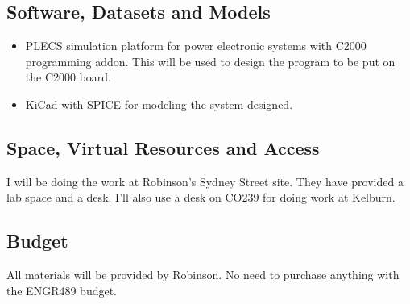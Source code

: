 \documentclass[11pt, a4paper, twoside, openright]{article}
\begin{document}

\subsection{Software, Datasets and Models}
\begin{itemize}
	\item PLECS simulation platform for power electronic systems with C2000 programming addon. This will be used to design the program to be put on the C2000 board.
	\item KiCad with SPICE for modeling the system designed.
\end{itemize}


\subsection{Space, Virtual Resources and Access}
I will be doing the work at Robinson's Sydney Street site. They have provided a lab space and a desk. I'll also use a desk on CO239 for doing work at Kelburn.

\subsection{Budget}
All materials will be provided by Robinson. No need to purchase anything with the ENGR489 budget.

\end{document}

